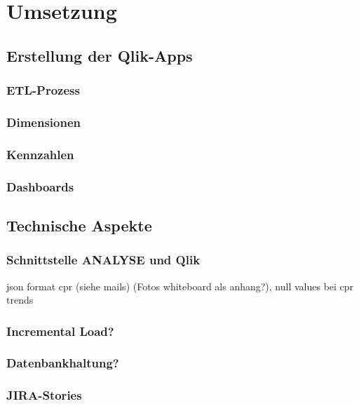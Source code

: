 \chapter{Umsetzung}
\label{umsetzung}
\minitoc\pagebreak

\section{Erstellung der Qlik-Apps}
\subsection{ETL-Prozess}
\subsection{Dimensionen}
\subsection{Kennzahlen}
\subsection{Dashboards}

\section{Technische Aspekte}
\subsection{Schnittstelle ANALYSE und Qlik}
json format cpr (siehe mails) (Fotos whiteboard als anhang?),
null values bei cpr trends
\subsection{Incremental Load?}
\subsection{Datenbankhaltung?}
\subsection{JIRA-Stories}
